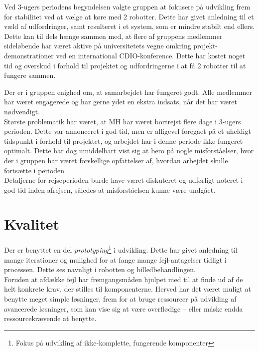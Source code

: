 Ved 3-ugers periodens begyndelsen valgte gruppen at fokusere på udvikling frem for stabilitet ved at vælge at køre med 2 robotter. Dette har givet anledning til et væld af udfordringer, samt resulteret i et system, som er mindre stabilt end ellers. Dette kan til dels hænge sammen med, at flere af gruppens medlemmer sideløbende har været aktive på universitetets vegne omkring projekt-demonstrationer ved en international CDIO-konference. Dette har kostet noget tid og overskud i forhold til projektet og udfordringerne i at få 2 robotter til at fungere sammen.

Der er i gruppen enighed om, at samarbejdet har fungeret godt. Alle medlemmer har været engagerede og har gerne ydet en ekstra indsats, når det har været nødvendigt.\\
Største problematik har været, at MH har været bortrejst flere dage i 3-ugers perioden. Dette var annonceret i god tid, men er alligevel foregået på et uheldigt tidspunkt i forhold til projektet, og arbejdet har i denne periode ikke fungeret optimalt. Dette har dog umiddelbart vist sig at bero på nogle misforståelser, hvor der i gruppen har været forskellige opfattelser af, hvordan arbejdet skulle fortsætte i perioden\\
Detaljerne for rejseperioden burde have været diskuteret og udførligt noteret i god tid inden afrejsen, således at misforståelsen kunne være undgået.

\section{Kvalitet}
Der er benyttet en del \textit{prototyping}\footnote{Fokus på udvikling af ikke-komplette, fungerende komponenter} i udvikling. Dette har givet anledning til mange iterationer og mulighed for at fange mange fejl-antagelser tidligt i processen. Dette ses navnligt i robotten og billedbehandlingen.\\
Foruden at afdække fejl har fremgangsmåden hjulpet med til at finde ud af de helt konkrete krav, der stilles til komponenterne. Herved har det været muligt at benytte meget simple løsninger, frem for at bruge ressourcer på udvikling af avancerede løsninger, som kan vise sig at være overflødige -- eller måske endda ressourcekrævende at benytte.
